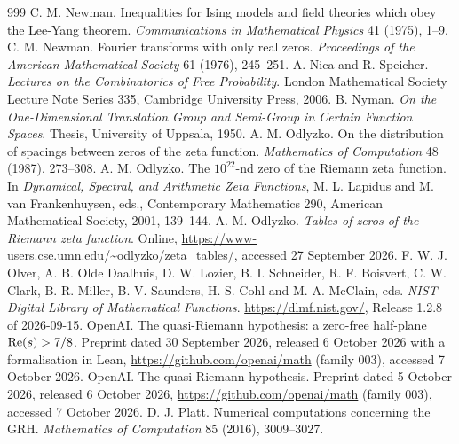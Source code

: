 \begin{thebibliography}{999}
 C. M. Newman. Inequalities for Ising models and field theories which obey the Lee-Yang theorem. \emph{Communications in Mathematical Physics} 41 (1975), 1--9.
 C. M. Newman. Fourier transforms with only real zeros. \emph{Proceedings of the American Mathematical Society} 61 (1976), 245--251.
 A. Nica and R. Speicher. \emph{Lectures on the Combinatorics of Free Probability}. London Mathematical Society Lecture Note Series 335, Cambridge University Press, 2006.
 B. Nyman. \emph{On the One-Dimensional Translation Group and Semi-Group in Certain Function Spaces}. Thesis, University of Uppsala, 1950.
 A. M. Odlyzko. On the distribution of spacings between zeros of the zeta function. \emph{Mathematics of Computation} 48 (1987), 273--308.
 A. M. Odlyzko. The $10^{22}$-nd zero of the Riemann zeta function. In \emph{Dynamical, Spectral, and Arithmetic Zeta Functions}, M. L. Lapidus and M. van Frankenhuysen, eds., Contemporary Mathematics 290, American Mathematical Society, 2001, 139--144.
 A. M. Odlyzko. \emph{Tables of zeros of the Riemann zeta function}. Online, \url{https://www-users.cse.umn.edu/~odlyzko/zeta_tables/}, accessed 27 September 2026.
 F. W. J. Olver, A. B. Olde Daalhuis, D. W. Lozier, B. I. Schneider, R. F. Boisvert, C. W. Clark, B. R. Miller, B. V. Saunders, H. S. Cohl and M. A. McClain, eds. \emph{NIST Digital Library of Mathematical Functions}. \url{https://dlmf.nist.gov/}, Release 1.2.8 of 2026-09-15.
 OpenAI. The quasi-Riemann hypothesis: a zero-free half-plane $\operatorname{Re}(s)>7/8$. Preprint dated 30 September 2026, released 6 October 2026 with a formalisation in Lean, \url{https://github.com/openai/math} (family 003), accessed 7 October 2026.
 OpenAI. The quasi-Riemann hypothesis. Preprint dated 5 October 2026, released 6 October 2026, \url{https://github.com/openai/math} (family 003), accessed 7 October 2026.
 D. J. Platt. Numerical computations concerning the GRH. \emph{Mathematics of Computation} 85 (2016), 3009--3027.

\end{thebibliography}

